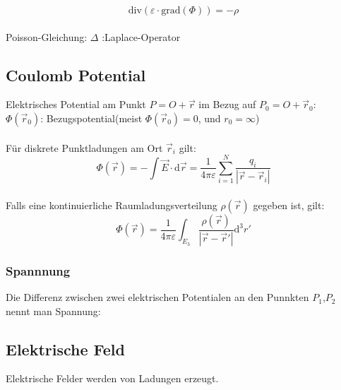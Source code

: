 \documentclass[10pt,a4paper]{scrartcl}
\begin{document}
\begin{equation*}
	\mathrm{div}(\varepsilon \cdot \mathrm{grad}(\Phi)) = -\rho
\end{equation*}\\
Poisson-Gleichung:  \qquad $\Delta$ :Laplace-Operator

\subsection{Coulomb Potential}
Elektrisches Potential am Punkt $P=O+\vec r$ im Bezug auf $P_0=O+\vec r_0$:\\
\qquad $\Phi(\vec r_0)$: Bezugspotential(meist $\Phi(\vec r_0) = 0$, und $r_0=\infty$)\\
\\
Für diskrete Punktladungen am Ort $\vec r_i$ gilt:
\begin{equation*}
	\Phi(\vec r)=-\int \vec E \cdot \mathrm d \vec r=\frac{1}{4\pi\varepsilon} \sum_{i=1}^N \frac{q_i}{|\vec r - \vec r_i|}
\end{equation*}
\\
Falls eine kontinuierliche Raumladungsverteilung $\rho(\vec r)$ gegeben ist, gilt:
\begin{equation*}
	\Phi(\vec r)=\frac{1}{4\pi\varepsilon} \int_{E_3} \frac{\rho(\vec r)}{|\vec r - \vec r'|} \mathrm d^3 r'
\end{equation*}

\subsubsection {Spannnung} %
Die Differenz zwischen zwei elektrischen Potentialen an den Punnkten $P_1$,$P_2$ nennt man Spannung:\\


\subsection{Elektrische Feld}
Elektrische Felder werden von Ladungen erzeugt.\\
\end{document}
